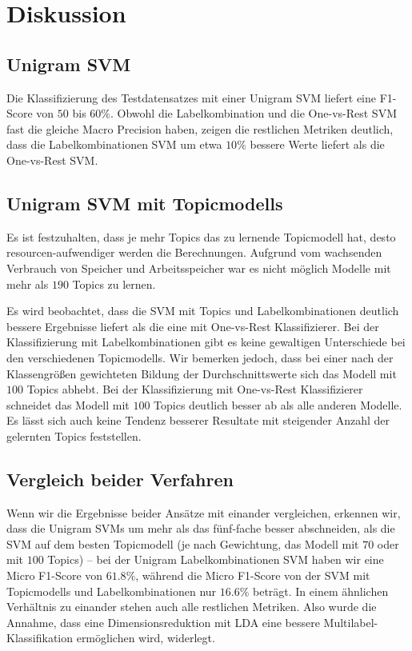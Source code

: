 \section{Diskussion}

\subsection{Unigram SVM}
Die Klassifizierung des Testdatensatzes mit einer Unigram SVM liefert eine F1-Score von $50$ bis $60 \%$.
Obwohl die Labelkombination und die One-vs-Rest SVM fast die gleiche Macro Precision haben, zeigen die restlichen Metriken deutlich, dass die Labelkombinationen SVM um etwa $10 \%$ bessere Werte liefert als die One-vs-Rest SVM.


\subsection{Unigram SVM mit Topicmodells}
Es ist festzuhalten, dass je mehr Topics das zu lernende Topicmodell hat, desto resourcen-aufwendiger werden die Berechnungen.
Aufgrund vom wachsenden Verbrauch von Speicher und Arbeitsspeicher war es nicht möglich Modelle mit mehr als $190$ Topics zu lernen.

Es wird beobachtet, dass die SVM mit Topics und Labelkombinationen deutlich bessere Ergebnisse liefert als die eine mit One-vs-Rest Klassifizierer.
Bei der Klassifizierung mit Labelkombinationen gibt es keine gewaltigen Unterschiede bei den verschiedenen Topicmodells.
Wir bemerken jedoch, dass bei einer nach der Klassengrößen gewichteten Bildung der Durchschnittswerte sich das Modell mit $100$ Topics abhebt.
Bei der Klassifizierung mit One-vs-Rest Klassifizierer schneidet das Modell mit $100$ Topics deutlich besser ab als alle anderen Modelle.
Es lässt sich auch keine Tendenz besserer Resultate mit steigender Anzahl der gelernten Topics feststellen.


\subsection{Vergleich beider Verfahren}
Wenn wir die Ergebnisse beider Ansätze mit einander vergleichen, erkennen wir, dass die Unigram SVMs um mehr als das fünf-fache besser abschneiden, als die SVM auf dem besten Topicmodell
(je nach Gewichtung, das Modell mit $70$ oder mit $100$ Topics) -- bei der Unigram Labelkombinationen SVM haben wir eine Micro F1-Score von $61.8 \%$, während die Micro F1-Score von der SVM mit Topicmodells und Labelkombinationen nur $16.6 \%$ beträgt.
In einem ähnlichen Verhältnis zu einander stehen auch alle restlichen Metriken.
Also wurde die Annahme, dass eine Dimensionsreduktion mit LDA eine bessere Multilabel-Klassifikation ermöglichen wird, widerlegt.



